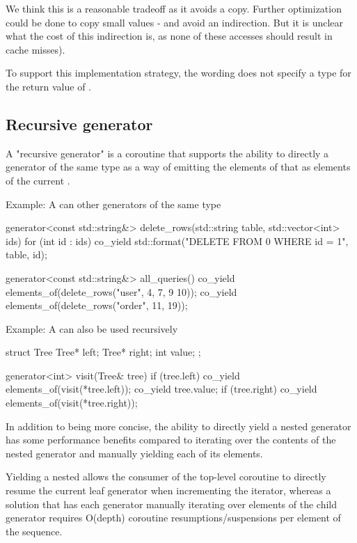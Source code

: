 \documentclass{wg21}
\begin{document}
We think this is a reasonable tradeoff as it avoids a copy.
Further optimization could be done to copy small values - and avoid an indirection.
But it is unclear what the cost of this indirection is, as none of these accesses should result in cache misses).

To support this implementation strategy, the wording does not specify a type for the return value of .


\subsection{Recursive generator}

A "recursive generator" is a coroutine that supports the ability to directly 
a generator of the same type as a way of emitting the elements of that 
as elements of the current .

Example: A  can  other generators of the same type
\begin{colorblock}
    generator<const std::string&> delete_rows(std::string table, std::vector<int> ids) {
        for (int id : ids) {
            co_yield std::format("DELETE FROM {0} WHERE id = {1}", table, id);
        }
    }

    generator<const std::string&> all_queries() {
        co_yield elements_of(delete_rows("user", {4, 7, 9 10}));
        co_yield elements_of(delete_rows("order", {11, 19}));
    }
\end{colorblock}

Example: A  can also be used recursively
\begin{colorblock}
    struct Tree {
        Tree* left;
        Tree* right;
        int value;
    };

    generator<int> visit(Tree& tree) {
        if (tree.left) co_yield elements_of(visit(*tree.left));
        co_yield tree.value;
        if (tree.right) co_yield elements_of(visit(*tree.right));
    }
\end{colorblock}

In addition to being more concise, the ability to directly yield a nested generator has some
performance benefits compared to iterating over the contents of the nested generator and
manually yielding each of its elements.

Yielding a nested  allows the consumer of the top-level coroutine to
directly resume the current leaf generator when incrementing the iterator, whereas a solution that has each generator manually iterating over elements of the child generator
requires O(depth) coroutine resumptions/suspensions per element of the sequence.
\end{document}
